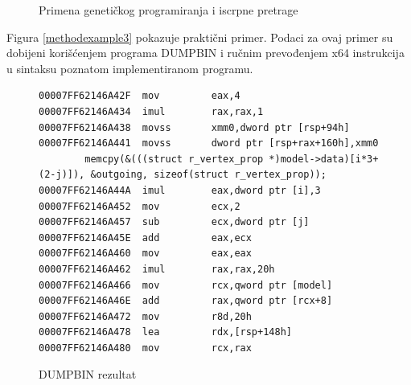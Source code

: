 \documentclass[a4paper, 12pt]{article}
\begin{document}
\begin{figure}
\centering
{}
\qquad
{}
\caption{Primena genetičkog programiranja i iscrpne pretrage}
\label{methodexample2}
\end{figure}

Figura \ref{methodexample3} pokazuje praktični primer. Podaci za ovaj primer su dobijeni korišćenjem programa DUMPBIN i ručnim prevođenjem x64 instrukcija u sintaksu poznatom implementiranom programu.

\begin{figure}
\begin{lstlisting}[language={[x86masm]Assembler}]
00007FF62146A42F  mov         eax,4
00007FF62146A434  imul        rax,rax,1
00007FF62146A438  movss       xmm0,dword ptr [rsp+94h]
00007FF62146A441  movss       dword ptr [rsp+rax+160h],xmm0
		memcpy(&(((struct r_vertex_prop *)model->data)[i*3+(2-j)]), &outgoing, sizeof(struct r_vertex_prop));
00007FF62146A44A  imul        eax,dword ptr [i],3
00007FF62146A452  mov         ecx,2
00007FF62146A457  sub         ecx,dword ptr [j]
00007FF62146A45E  add         eax,ecx
00007FF62146A460  mov         eax,eax
00007FF62146A462  imul        rax,rax,20h
00007FF62146A466  mov         rcx,qword ptr [model]
00007FF62146A46E  add         rax,qword ptr [rcx+8]
00007FF62146A472  mov         r8d,20h
00007FF62146A478  lea         rdx,[rsp+148h]
00007FF62146A480  mov         rcx,rax
\end{lstlisting}
\caption{DUMPBIN rezultat}
\end{figure}
\end{document}
